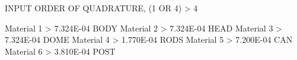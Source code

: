 INPUT ORDER OF QUADRATURE, (1 OR 4) > 4

  Material  1 > 7.324E-04  BODY
  Material  2 > 7.324E-04  HEAD
  Material  3 > 7.324E-04  DOME
  Material  4 > 1.770E-04  RODS
  Material  5 > 7.200E-04  CAN
  Material  6 > 3.810E-04  POST 
